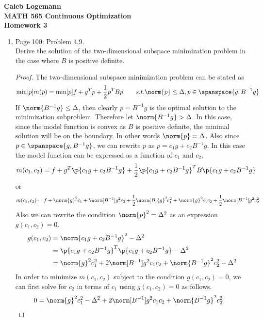 \documentclass[11pt, oneside]{article}
\begin{document}
\noindent \textbf{\Large{Caleb Logemann \\
MATH 565 Continuous Optimization \\
Homework 3
}}

%
\begin{enumerate}
  \item %
    Page 100: Problem 4.9. \\
    Derive the solution of the two-dimensional subspace minimization problem in
    the case where $B$ is positive definite.

    \begin{proof}
      The two-dimensional subspace minimization problem can be stated as
      \[
        \min[p]{m(p)} = \min[p]{f + g^T p + \frac{1}{2} p^T B p} \qquad s.t. \norm{p} \le \Delta, p \in \spanspace{g, B^{-1} g}
      \]
      If $\norm{B^{-1} g} \le \Delta$, then clearly $p = B^{-1} g$ is the optimal
      solution to the minimization subproblem.
      Therefore let $\norm{B^{-1} g} > \Delta$.
      In this case, since the model function is convex as $B$ is positive
      definite, the minimal solution will be on the boundary.
      In other words $\norm{p} = \Delta$.
      Also since $p \in \spanspace{g, B^{-1}g}$, we can rewrite $p$ as
      $p = c_1 g + c_2 B^{-1} g$.
      In this case the model function can be expressed as a function of $c_1$
      and $c_2$,
      \[
        m(c_1, c_2) = f + g^T \p{c_1 g + c_2 B^{-1} g} + \frac{1}{2} \p{c_1 g + c_2 B^{-1} g}^T B \p{c_1 g + c_2 B^{-1} g}
      \]
      or
      \[
        m(c_1, c_2) = f + \norm{g}^2 c_1 + \norm[B^{-1}]{g}^2 c_2 + \frac{1}{2} \norm[B]{g}^2 c_1^2 + \norm{g}^2 c_1 c_2 + \frac{1}{2} \norm[B^{-1}]{g}^2 c_2^2
      \]
      Also we can rewrite the condition $\norm{p}^2 = \Delta^2$ as an expression $g(c_1, c_2) = 0$.
      \begin{align*}
        g(c_1, c_2) &= \norm{c_1 g + c_2 B^{-1} g}^2 - \Delta^2 \\
        &= \p{c_1 g + c_2 B^{-1} g}^T \p{c_1 g + c_2 B^{-1} g} - \Delta^2 \\
        &= \norm{g}^2 c_1^2 + 2 \norm[B^{-1}]{g}^2 c_1 c_2 + \norm{B^{-1} g}^2 c_2^2 - \Delta^2
      \end{align*}
      In order to minimize $m(c_1, c_2)$ subject to the condition
      $g(c_1, c_2) = 0$, we can first solve for $c_2$ in terms of $c_1$ using
      $g(c_1, c_2) = 0$ as follows.
      \begin{align*}
        0 &= \norm{g}^2 c_1^2 - \Delta^2 + 2 \norm[B^{-1}]{g}^2 c_1 c_2 + \norm{B^{-1} g}^2 c_2^2

\end{align*}
\end{proof}
\end{enumerate}
\end{document}
